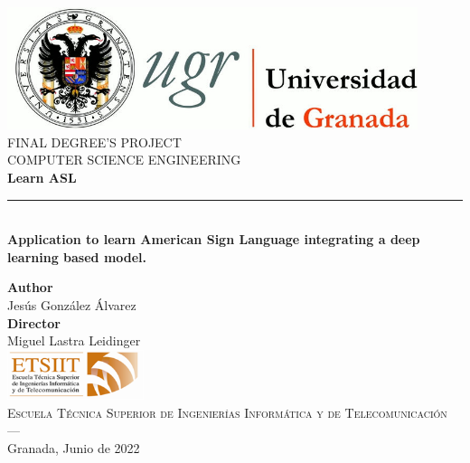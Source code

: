 \begin{titlepage}
\newlength{\centeroffset}
\setlength{\centeroffset}{-0.5\oddsidemargin}
\addtolength{\centeroffset}{0.5\evensidemargin}
\thispagestyle{empty}

\noindent\hspace*{\centeroffset}\begin{minipage}{\textwidth}

\centering
\includegraphics[width=0.9\textwidth]{logos/logo_ugr.jpg}\\[1.4cm]

\textsc{ \Large FINAL DEGREE'S PROJECT\\[0.2cm]}
\textsc{ COMPUTER SCIENCE ENGINEERING}\\[1cm]

{\Huge\bfseries Learn ASL \\}
\noindent\rule[-1ex]{\textwidth}{3pt}\\[3.5ex]
{\large\bfseries Application to learn American Sign Language integrating a deep learning based model. }
\end{minipage}

\vspace{2.5cm}
\noindent\hspace*{\centeroffset}
\begin{minipage}{\textwidth}
\centering

\textbf{Author}\\ {Jesús González Álvarez}\\[2.5ex]
\textbf{Director}\\ {Miguel Lastra Leidinger}\\[2cm]
\includegraphics[width=0.3\textwidth]{logos/etsiit_logo.png}\\[0.1cm]
\textsc{Escuela Técnica Superior de Ingenierías Informática y de Telecomunicación}\\
\textsc{---}\\
Granada, Junio de 2022
\end{minipage}
\end{titlepage}
